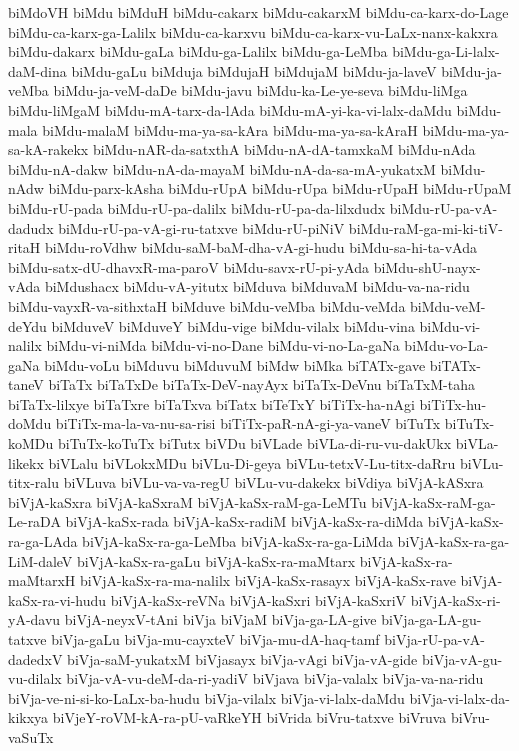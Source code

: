 {biMdoVH
biMdu
biMduH
biMdu-cakarx
biMdu-cakarxM
biMdu-ca-karx-do-Lage
biMdu-ca-karx-ga-Lalilx
biMdu-ca-karxvu
biMdu-ca-karx-vu-LaLx-nanx-kakxra
biMdu-dakarx
biMdu-gaLa
biMdu-ga-Lalilx
biMdu-ga-LeMba
biMdu-ga-Li-lalx-daM-dina
biMdu-gaLu
biMduja
biMdujaH
biMdujaM
biMdu-ja-laveV
biMdu-ja-veMba
biMdu-ja-veM-daDe
biMdu-javu
biMdu-ka-Le-ye-seva
biMdu-liMga
biMdu-liMgaM
biMdu-mA-tarx-da-lAda
biMdu-mA-yi-ka-vi-lalx-daMdu
biMdu-mala
biMdu-malaM
biMdu-ma-ya-sa-kAra
biMdu-ma-ya-sa-kAraH
biMdu-ma-ya-sa-kA-rakekx
biMdu-nAR-da-satxthA
biMdu-nA-dA-tamxkaM
biMdu-nAda
biMdu-nA-dakw
biMdu-nA-da-mayaM
biMdu-nA-da-sa-mA-yukatxM
biMdu-nAdw
biMdu-parx-kAsha
biMdu-rUpA
biMdu-rUpa
biMdu-rUpaH
biMdu-rUpaM
biMdu-rU-pada
biMdu-rU-pa-dalilx
biMdu-rU-pa-da-lilxdudx
biMdu-rU-pa-vA-dadudx
biMdu-rU-pa-vA-gi-ru-tatxve
biMdu-rU-piNiV
biMdu-raM-ga-mi-ki-tiV-ritaH
biMdu-roVdhw
biMdu-saM-baM-dha-vA-gi-hudu
biMdu-sa-hi-ta-vAda
biMdu-satx-dU-dhavxR-ma-paroV
biMdu-savx-rU-pi-yAda
biMdu-shU-nayx-vAda
biMdushacx
biMdu-vA-yitutx
biMduva
biMduvaM
biMdu-va-na-ridu
biMdu-vayxR-va-sithxtaH
biMduve
biMdu-veMba
biMdu-veMda
biMdu-veM-deYdu
biMduveV
biMduveY
biMdu-vige
biMdu-vilalx
biMdu-vina
biMdu-vi-nalilx
biMdu-vi-niMda
biMdu-vi-no-Dane
biMdu-vi-no-La-gaNa
biMdu-vo-La-gaNa
biMdu-voLu
biMduvu
biMduvuM
biMdw
biMka
biTATx-gave
biTATx-taneV
biTaTx
biTaTxDe
biTaTx-DeV-nayAyx
biTaTx-DeVnu
biTaTxM-taha
biTaTx-lilxye
biTaTxre
biTaTxva
biTatx
biTeTxY
biTiTx-ha-nAgi
biTiTx-hu-doMdu
biTiTx-ma-la-va-nu-sa-risi
biTiTx-paR-nA-gi-ya-vaneV
biTuTx
biTuTx-koMDu
biTuTx-koTuTx
biTutx
biVDu
biVLade
biVLa-di-ru-vu-dakUkx
biVLa-likekx
biVLalu
biVLokxMDu
biVLu-Di-geya
biVLu-tetxV-Lu-titx-daRru
biVLu-titx-ralu
biVLuva
biVLu-va-va-regU
biVLu-vu-dakekx
biVdiya
biVjA-kASxra
biVjA-kaSxra
biVjA-kaSxraM
biVjA-kaSx-raM-ga-LeMTu
biVjA-kaSx-raM-ga-Le-raDA
biVjA-kaSx-rada
biVjA-kaSx-radiM
biVjA-kaSx-ra-diMda
biVjA-kaSx-ra-ga-LAda
biVjA-kaSx-ra-ga-LeMba
biVjA-kaSx-ra-ga-LiMda
biVjA-kaSx-ra-ga-LiM-daleV
biVjA-kaSx-ra-gaLu
biVjA-kaSx-ra-maMtarx
biVjA-kaSx-ra-maMtarxH
biVjA-kaSx-ra-ma-nalilx
biVjA-kaSx-rasayx
biVjA-kaSx-rave
biVjA-kaSx-ra-vi-hudu
biVjA-kaSx-reVNa
biVjA-kaSxri
biVjA-kaSxriV
biVjA-kaSx-ri-yA-davu
biVjA-neyxV-tAni
biVja
biVjaM
biVja-ga-LA-give
biVja-ga-LA-gu-tatxve
biVja-gaLu
biVja-mu-cayxteV
biVja-mu-dA-haq-tamf
biVja-rU-pa-vA-dadedxV
biVja-saM-yukatxM
biVjasayx
biVja-vAgi
biVja-vA-gide
biVja-vA-gu-vu-dilalx
biVja-vA-vu-deM-da-ri-yadiV
biVjava
biVja-valalx
biVja-va-na-ridu
biVja-ve-ni-si-ko-LaLx-ba-hudu
biVja-vilalx
biVja-vi-lalx-daMdu
biVja-vi-lalx-da-kikxya
biVjeY-roVM-kA-ra-pU-vaRkeYH
biVrida
biVru-tatxve
biVruva
biVru-vaSuTx
}
